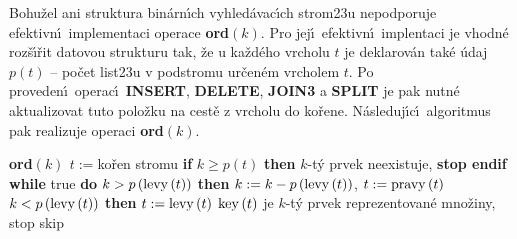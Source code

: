 \flushpar Bohu\v zel ani struktura bin\'arn\'\i ch vyhled\'avac\'\i ch 
strom\accent23u nepodporuje efektivn\'\i\ implementaci operace 
{\bf ord$\left(k\right)$}. Pro jej\'\i\ efektivn\'\i\ implentaci je vhodn\'e roz\v s\'\i\v rit 
datovou strukturu tak, \v ze u ka\v zd\'eho vrcholu $t$ je deklarov\'an 
tak\'e \'udaj $p\left(t\right)$ -- po\v cet list\accent23u v podstromu ur\v cen\'em 
vrcholem $t$. Po proveden\'\i\ operac\'\i\ {\bf INSERT}, {\bf DELETE}, {\bf JOIN3} a 
{\bf SPLIT} je pak nutn\'e aktualizovat tuto polo\v zku na cest\v e z 
vrcholu do ko\v rene. N\'asleduj\'\i c\'\i\ algoritmus pak 
realizuje operaci {\bf ord}$\left(k\right)$.
\medskip

{\bf ord$\left(k\right)$ \newline 
$t:=$}ko\v ren stromu \newline 
{\bf if} $k\ge p\left(t\right)$ {\bf then} $k$-t\'y prvek neexistuje, {\bf stop endif\newline 
while} true {\bf do}\newline 
\phantom{---}{\bf if} $k>p\left(\operatorname{levy}\left(t\right)\right)$ {\bf then}\newline 
\phantom{------}$k:=k-p\left(\operatorname{levy}\left(t\right)\right)$, $t:=\operatorname{pravy}\left(t\right)$\newline 
\phantom{---}{\bf else}\newline 
\phantom{------}{\bf if} $k<p\left(\operatorname{levy}\left(t\right)\right)$ {\bf then}\newline 
\phantom{---------}$t:=\operatorname{levy}\left(t\right)$\newline 
\phantom{------}{\bf else}\newline 
\phantom{---------}$\operatorname{key}\left(t\right)$ je $k$-t\'y prvek reprezentovan\'e mno\v ziny, stop \newline 
\phantom{------}{\bf endif}\newline 
\phantom{---}{\bf endif\newline 
enddo}
skip

